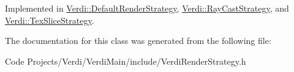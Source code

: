 \-Implemented in \hyperlink{class_verdi_1_1_default_render_strategy_a3d4ad97fb6c44e760d7f9fb3e79d5813}{\-Verdi\-::\-Default\-Render\-Strategy}, \hyperlink{class_verdi_1_1_ray_cast_strategy_a23af8b285ef2de2957f397b9674c7a01}{\-Verdi\-::\-Ray\-Cast\-Strategy}, and \hyperlink{class_verdi_1_1_tex_slice_strategy_abaf58e07219e1aab4d0016044da15f4d}{\-Verdi\-::\-Tex\-Slice\-Strategy}.



\-The documentation for this class was generated from the following file\-:\begin{DoxyCompactItemize}
\item 
\-Code Projects/\-Verdi/\-Verdi\-Main/include/\-Verdi\-Render\-Strategy.\-h\end{DoxyCompactItemize}
